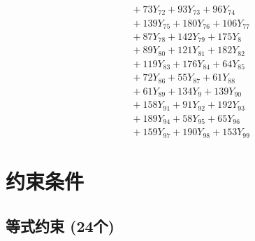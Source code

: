 \documentclass[a4paper,10pt]{article}
\begin{document}
{\begin{align}
&\quad  + 73Y_{72} + 93Y_{73} + 96Y_{74} \\[0.5ex]
&\quad  + 139Y_{75} + 180Y_{76} + 106Y_{77} \\[0.5ex]
&\quad  + 87Y_{78} + 142Y_{79} + 175Y_{8} \\[0.5ex]
&\quad  + 89Y_{80} + 121Y_{81} + 182Y_{82} \\[0.5ex]
&\quad  + 119Y_{83} + 176Y_{84} + 64Y_{85} \\[0.5ex]
&\quad  + 72Y_{86} + 55Y_{87} + 61Y_{88} \\[0.5ex]
&\quad  + 61Y_{89} + 134Y_{9} + 139Y_{90} \\[0.5ex]
&\quad  + 158Y_{91} + 91Y_{92} + 192Y_{93} \\[0.5ex]
&\quad  + 189Y_{94} + 58Y_{95} + 65Y_{96} \\[0.5ex]
&\quad  + 159Y_{97} + 190Y_{98} + 153Y_{99}\nonumber
\end{align}
}

\section{约束条件}

\subsection{等式约束 (24个)}
\end{document}
